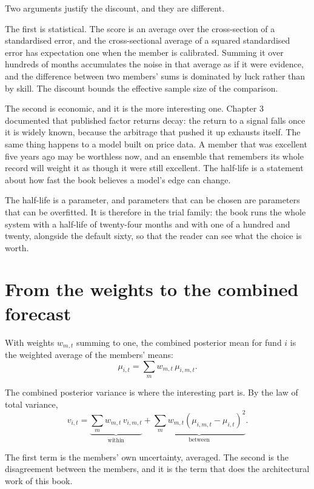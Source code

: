 Two arguments justify the discount, and they are different.

The first is statistical. The score is an average over the cross-section
of a standardised error, and the cross-sectional average of a squared
standardised error has expectation one when the member is calibrated.
Summing it over hundreds of months accumulates the noise in that average
as if it were evidence, and the difference between two members' sums is
dominated by luck rather than by skill. The discount bounds the effective
sample size of the comparison.

The second is economic, and it is the more interesting one. Chapter 3
documented that published factor returns decay: the return to a signal
falls once it is widely known, because the arbitrage that pushed it up
exhausts itself. The same thing happens to a model built on price data.
A member that was excellent five years ago may be worthless now, and an
ensemble that remembers its whole record will weight it as though it were
still excellent. The half-life is a statement about how fast the book
believes a model's edge can change.

The half-life is a parameter, and parameters that can be chosen are
parameters that can be overfitted. It is therefore in the trial family:
the book runs the whole system with a half-life of twenty-four months and
with one of a hundred and twenty, alongside the default sixty, so that the
reader can see what the choice is worth.

\section{From the weights to the combined forecast}

With weights \(w_{m,t}\) summing to one, the combined posterior mean for
fund \(i\) is the weighted average of the members' means:
\begin{equation}
\mu_{i,t} = \sum_m w_{m,t}\,\mu_{i,m,t}.
\end{equation}

The combined posterior variance is where the interesting part is. By the
law of total variance,
\begin{equation}
v_{i,t} = \underbrace{\sum_m w_{m,t}\,v_{i,m,t}}_{\text{within}}
          + \underbrace{\sum_m w_{m,t}\left(\mu_{i,m,t} - \mu_{i,t}\right)^2}_{\text{between}} .
\end{equation}

The first term is the members' own uncertainty, averaged. The second is
the disagreement between the members, and it is the term that does the
architectural work of this book.

